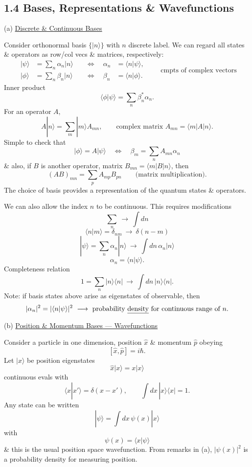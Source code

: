 \documentclass[11pt,a4paper]{article}
\begin{document}
\subsection*{1.4 Bases, Representations \& Wavefunctions}

\noindent
(a) \underline{Discrete \& Continuous Bases}

Consider orthonormal basis $\{|n\rangle\}$ with $n$ discrete label.
We can regard all states \& operators as row/col vecs \& matrices, respectively:
\[
    \begin{aligned}
        |\psi\rangle&=\sum_n\alpha_n|n\rangle
        &\quad\Longleftrightarrow\quad \alpha_n&=\langle n|\psi\rangle,\\
        |\phi\rangle&=\sum_n\beta_n|n\rangle
        &\quad\Longleftrightarrow\quad \beta_n&=\langle n|\phi\rangle.
    \end{aligned}
    \qquad\text{cmpts of complex vectors}
\]
Inner product
\[
    \langle\phi|\psi\rangle=\sum_n\beta_n^*\alpha_n.
\]
For an operator $A$,
\[
    A|n\rangle=\sum_m|m\rangle A_{mn},
    \qquad\text{complex matrix }A_{mn}=\langle m|A|n\rangle.
\]
Simple to check that
\[
    |\phi\rangle=A|\psi\rangle
    \quad\Longleftrightarrow\quad
    \beta_m=\sum_n A_{mn}\alpha_n
\]
\& also, if $B$ is another operator, matrix $B_{mn}=\langle m|B|n\rangle$, then
\[
    (AB)_{mn}=\sum_p A_{mp}B_{pn}
    \qquad\text{(matrix multiplication)}.
\]
The choice of basis provides a representation of the quantum states \& operators.

We can also allow the index $n$ to be continuous. This requires modifications
\[
    \sum_n\ \longrightarrow\ \int dn
\]
\[
    \langle n|m\rangle=\delta_{nm}\ \longrightarrow\ \delta(n-m)
\]
\[
    |\psi\rangle=\sum_n\alpha_n|n\rangle
    \ \longrightarrow\ \int dn\,\alpha_n|n\rangle
\]
\[
    \alpha_n=\langle n|\psi\rangle.
\]
Completeness relation
\[
    1=\sum_n|n\rangle\langle n|
    \ \longrightarrow\ \int dn\,|n\rangle\langle n|.
\]
Note: if basis states above arise as eigenstates of observable, then
\[
    |\alpha_n|^2=|\langle n|\psi\rangle|^2
    \ \longrightarrow\ \text{probability \underline{density} for continuous range of }n.
\]

\medskip
\noindent
(b) \underline{Position \& Momentum Bases --- Wavefunctions}

Consider a particle in one dimension, position $\hat{x}$ \& momentum $\hat{p}$
obeying
\[
    [\hat{x},\hat{p}]=i\hbar.
\]
Let $|x\rangle$ be position eigenstates
\[
    \hat{x}|x\rangle=x|x\rangle
\]
continuous evals with
\[
    \langle x|x'\rangle=\delta(x-x'),
    \qquad \int dx\,|x\rangle\langle x|=1.
\]
Any state can be written
\[
    |\psi\rangle=\int dx\,\psi(x)|x\rangle
\]
with
\[
    \psi(x)=\langle x|\psi\rangle
\]
\& this is the usual position space wavefunction.
From remarks in (a), $|\psi(x)|^2$ is a probability density for measuring position.
\end{document}
